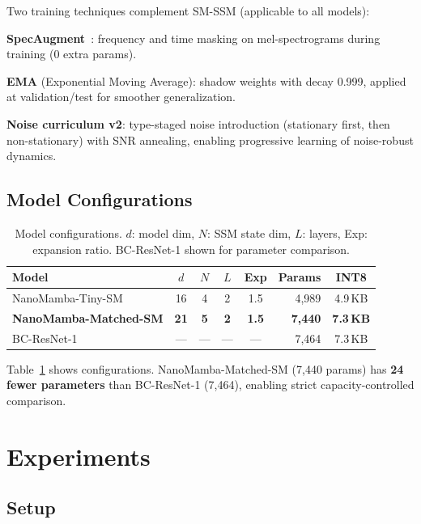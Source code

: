 \documentclass{Interspeech}
\begin{document}
Two training techniques complement SM-SSM (applicable to all models):

\smallskip\noindent\textbf{SpecAugment}~\cite{park2019specaugment}: frequency and time masking on mel-spectrograms during training (0 extra params).

\smallskip\noindent\textbf{EMA} (Exponential Moving Average): shadow weights with decay 0.999, applied at validation/test for smoother generalization.

\smallskip\noindent\textbf{Noise curriculum v2}: type-staged noise introduction (stationary first, then non-stationary) with SNR annealing, enabling progressive learning of noise-robust dynamics.

\subsection{Model Configurations}

\begin{table}[t]
\centering
\caption{Model configurations. $d$: model dim, $N$: SSM state dim, $L$: layers, Exp: expansion ratio. BC-ResNet-1 shown for parameter comparison.}
\label{tab:configs}
\small
\setlength{\tabcolsep}{3pt}
\begin{tabular}{lccccrc}
\toprule
\textbf{Model} & $d$ & $N$ & $L$ & Exp & \textbf{Params} & \textbf{INT8} \\
\midrule
NanoMamba-Tiny-SM    & 16 & 4 & 2 & 1.5 & 4,989  & 4.9\,KB \\
\textbf{NanoMamba-Matched-SM} & \textbf{21} & \textbf{5} & \textbf{2} & \textbf{1.5} & \textbf{7,440} & \textbf{7.3\,KB} \\
\midrule
BC-ResNet-1~\cite{kim2021bcresnet} & --- & --- & --- & --- & 7,464 & 7.3\,KB \\
\bottomrule
\end{tabular}
\end{table}

Table~\ref{tab:configs} shows configurations.
NanoMamba-Matched-SM (7,440 params) has \textbf{24 fewer parameters} than BC-ResNet-1 (7,464), enabling strict capacity-controlled comparison.

\section{Experiments}

\subsection{Setup}
\end{document}

